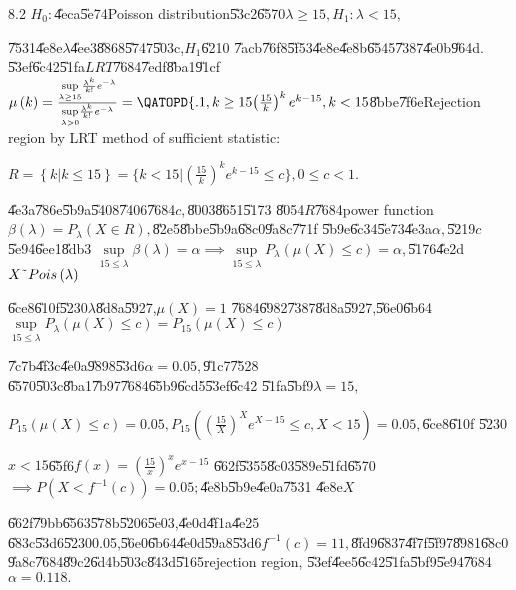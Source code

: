 \documentclass{article}
\begin{document}
8.2 $H_{0}:$\U{4eca}\U{5e74}Poisson distribution\U{53c2}\U{6570}$\lambda
\geq 15,H_{1}:\lambda <15,$

\U{7531}\U{4e8e}$\lambda $\U{4ee3}\U{8868}\U{5747}\U{503c},$H_{1}$\U{6210}%
\U{7acb}\U{76f8}\U{5f53}\U{4e8e}\U{4e8b}\U{6545}\U{7387}\U{4e0b}\U{964d}. 
\U{53ef}\U{6c42}\U{51fa}$LRT$\U{7684}\U{7edf}\U{8ba1}\U{91cf}$\mu \left(
k\right) =\frac{\underset{\lambda \geq 15}{\sup }\frac{\lambda ^{k}}{k!}%
e^{-\lambda }}{\underset{\lambda >0}{\sup }\frac{\lambda ^{k}}{k!}%
e^{-\lambda }}=\QATOPD\{ . {1,k\geq 15}{\left( \frac{15}{k}\right)
^{k}e^{k-15},k<15}$\U{8bbe}\U{7f6e}Rejection region by LRT method of
sufficient statistic:

$R=\left\{ k|k\leq 15\right\} =\{k<15|\left( \frac{15}{k}\right)
^{k}e^{k-15}\leq c\},0\leq c<1.$

\U{4e3a}\U{786e}\U{5b9a}\U{5408}\U{7406}\U{7684}$c,$\U{8003}\U{8651}\U{5173}%
\U{8054}$R$\U{7684}power function $\beta \left( \lambda \right) =P_{\lambda
}\left( X\in R\right) ,$\U{82e5}\U{8bbe}\U{5b9a}\U{68c0}\U{9a8c}\U{771f}%
\U{5b9e}\U{6c34}\U{5e73}\U{4e3a}$\alpha ,$\U{5219}$c$\U{5e94}\U{6ee1}\U{8db3}%
$\underset{15\leq \lambda }{\sup }\beta \left( \lambda \right) =\alpha
\implies \underset{15\leq \lambda }{\sup }P_{\lambda }\left( \mu \left(
X\right) \leq c\right) =\alpha ,$\U{5176}\U{4e2d}$X\symbol{126}Pois\left(
\lambda \right) $

\U{6ce8}\U{610f}\U{5230}$\lambda $\U{8d8a}\U{5927},$\mu \left( X\right) =1$%
\U{7684}\U{6982}\U{7387}\U{8d8a}\U{5927},\U{56e0}\U{6b64}$\underset{15\leq
\lambda }{\sup }P_{\lambda }\left( \mu \left( X\right) \leq c\right)
=P_{15}\left( \mu \left( X\right) \leq c\right) $

\U{7c7b}\U{4f3c}\U{4e0a}\U{9898}\U{53d6}$\alpha =0.05,$\U{91c7}\U{7528}%
\U{6570}\U{503c}\U{8ba1}\U{7b97}\U{7684}\U{65b9}\U{6cd5}\U{53ef}\U{6c42}%
\U{51fa}\U{5bf9}$\lambda =15,$

$P_{15}\left( \mu \left( X\right) \leq c\right) =0.05,P_{15}\left( \left( 
\frac{15}{X}\right) ^{X}e^{X-15}\leq c,X<15\right) =0.05,$\U{6ce8}\U{610f}%
\U{5230}

$x<15$\U{65f6}$f\left( x\right) =\left( \frac{15}{x}\right) ^{x}e^{x-15}$%
\U{662f}\U{5355}\U{8c03}\U{589e}\U{51fd}\U{6570}$\implies P\left(
X<f^{-1}\left( c\right) \right) =0.05;$\U{4e8b}\U{5b9e}\U{4e0a}\U{7531}%
\U{4e8e}$X$

\U{662f}\U{79bb}\U{6563}\U{578b}\U{5206}\U{5e03},\U{4e0d}\U{4f1a}\U{4e25}%
\U{683c}\U{53d6}\U{5230}0.05,\U{56e0}\U{6b64}\U{4e0d}\U{59a8}\U{53d6}$%
f^{-1}\left( c\right) =11,$\U{8fd9}\U{6837}\U{4f7f}\U{5f97}\U{8981}\U{68c0}%
\U{9a8c}\U{7684}\U{89c2}\U{6d4b}\U{503c}\U{843d}\U{5165}rejection region,%
\U{53ef}\U{4ee5}\U{6c42}\U{51fa}\U{5bf9}\U{5e94}\U{7684}$\alpha =0.118.$
\end{document}
